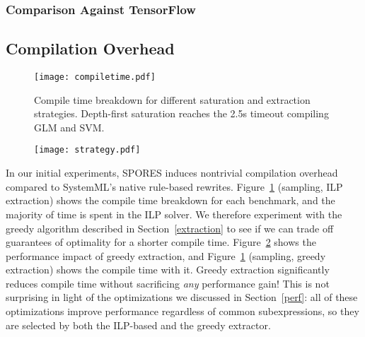 \subsubsection*{Comparison Against TensorFlow}
\subsection{Compilation Overhead} \label{overhead}
\begin{figure}
    \centering
    \texttt{[image: compiletime.pdf]}
    \caption{Compile time breakdown for different saturation and extraction
      strategies. Depth-first saturation reaches the 2.5s timeout compiling GLM and SVM. }
    \label{compile}
    \vspace{5pt}
\end{figure}{}
\begin{figure}
    \centering  \texttt{[image: strategy.pdf]}
    \caption{} 
    \label{sampleeval}
\end{figure}

In our initial experiments, SPORES induces nontrivial compilation
overhead compared to SystemML's native rule-based rewrites. Figure~\ref{compile}
 (sampling, ILP extraction) shows the compile time breakdown for each benchmark, and the majority of time is
spent in the ILP solver. We therefore experiment with the greedy algorithm 
described in Section~\ref{extraction}
 to see if we can trade off guarantees of optimality for a shorter
compile time. Figure~\ref{sampleeval}
shows the performance impact of greedy extraction, and Figure~\ref{compile} (sampling, greedy extraction)
shows the compile time with it. Greedy extraction significantly reduces compile
time without sacrificing \textit{any} performance gain! This is not surprising
in light of the optimizations we discussed in Section~\ref{perf}: all of
these optimizations improve performance regardless of common
subexpressions, so they are selected by both the ILP-based and the greedy
extractor.

